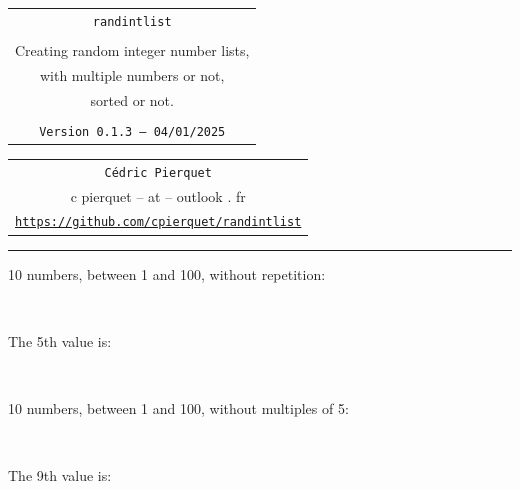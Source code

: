 \documentclass[11pt,a4paper]{ltxdoc}
\def\TPversion{0.1.3}
\def\TPdate{04/01/2025}
\begin{document}
\thispagestyle{empty}

\begin{center}
	\begin{minipage}{0.88\linewidth}
		\begin{tcolorbox}[colframe=yellow,colback=yellow!15]
			\begin{center}
				\renewcommand{\arraystretch}{1.25}%
				\begin{tabular}{c}
					{\Huge \texttt{randintlist}}\\
					\\
					{\LARGE Creating random integer number lists,} \\
					{\LARGE with multiple numbers or not,} \\
					{\LARGE sorted or not.} \\
					\\
					{\small \texttt{Version \TPversion{} -- \TPdate}}
				\end{tabular}
			\end{center}
		\end{tcolorbox}
	\end{minipage}
\end{center}

\begin{center}
	\begin{tabular}{c}
		\texttt{Cédric Pierquet}\\
		{\ttfamily c pierquet -- at -- outlook . fr}\\
		\texttt{\url{https://github.com/cpierquet/randintlist}} \\
	\end{tabular}
\end{center}

\hrule

\vfill

\begin{tcolorbox}[colframe=lightgray,colback=lightgray!5]
10 numbers, between 1 and 100, without repetition:

\hfill\randintlist[min=1,max=100,nb=10]{\mylist}\textcolor{red}{\mylist}\hfill~

The 5th value is:

\hfill\textcolor{blue}{}\hfill~
\end{tcolorbox}

\begin{tcolorbox}[colframe=lightgray,colback=lightgray!5]
10 numbers, between 1 and 100, without multiples of 5:

\hfill\randintlist[min=1,max=100,nb=10,exclude={5,10,15,20,25,30,35,40,45,50,55,60,65,70,75,80,85,90,95,100}]{\mylist}\textcolor{olive}{\mylist}\hfill~

The 9th value is:

\hfill\textcolor{purple}{}\hfill~
\end{tcolorbox}
\end{document}
